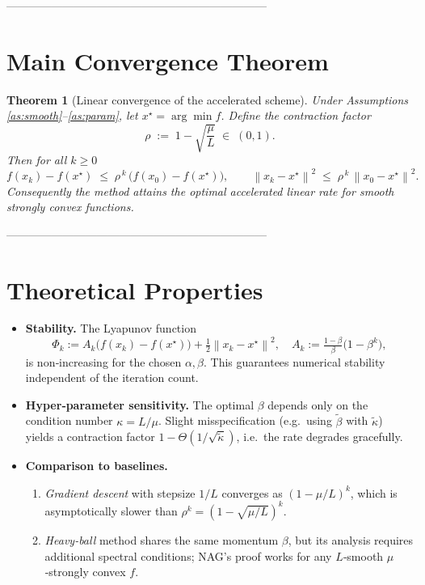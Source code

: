 \documentclass{article}
\newtheorem{theorem}{Theorem}
\newcommand{\norm}[1]{\left\lVert#1\right\rVert}
\begin{document}
---------------------------------------------------------------------

\section*{Main Convergence Theorem}
\begin{theorem}[Linear convergence of the accelerated scheme]\label{thm:linear}
Under Assumptions \ref{as:smooth}–\ref{as:param}, let $x^{\star}=\arg\min f$.
Define the contraction factor
\[
\rho \;:=\; 1-\sqrt{\frac{\mu}{L}} \;\in\;(0,1).
\]
Then for all $k\ge 0$
\[
f(x_{k})-f(x^{\star})\;\le\; \rho^{\,k}\,\bigl(f(x_{0})-f(x^{\star})\bigr),
\qquad
\norm{x_{k}-x^{\star}}^{2}\;\le\; \rho^{\,k}\,\norm{x_{0}-x^{\star}}^{2}.
\]
Consequently the method attains the optimal accelerated linear rate for smooth strongly convex functions.
\end{theorem}

---------------------------------------------------------------------

\section*{Theoretical Properties}
\begin{itemize}[leftmargin=*]
\item \textbf{Stability.} The Lyapunov function
\[
\Phi_{k}:=A_{k}\bigl(f(x_{k})-f(x^{\star})\bigr)+\tfrac12\norm{x_{k}-x^{\star}}^{2},
\quad A_{k}:=\tfrac{1-\beta}{\beta}\bigl(1-\beta^{k}\bigr),
\]
is non‑increasing for the chosen $\alpha,\beta$. This guarantees numerical stability independent of the iteration count.
\item \textbf{Hyper‑parameter sensitivity.} The optimal $\beta$ depends only on the condition number $\kappa=L/\mu$. Slight misspecification (e.g.\ using $\tilde\beta$ with $\tilde\kappa$) yields a contraction factor $1-\Theta(1/\sqrt{\tilde\kappa})$, i.e.\ the rate degrades gracefully.
\item \textbf{Comparison to baselines.}
\begin{enumerate}
\item \emph{Gradient descent} with stepsize $1/L$ converges as $(1-\mu/L)^{k}$, which is asymptotically slower than $\rho^{k}= (1-\sqrt{\mu/L})^{k}$.
\item \emph{Heavy‑ball} method shares the same momentum $\beta$, but its analysis requires additional spectral conditions; NAG’s proof works for any $L$‑smooth $\mu$‑strongly convex $f$.
\end{enumerate}
\end{itemize}
\end{document}
